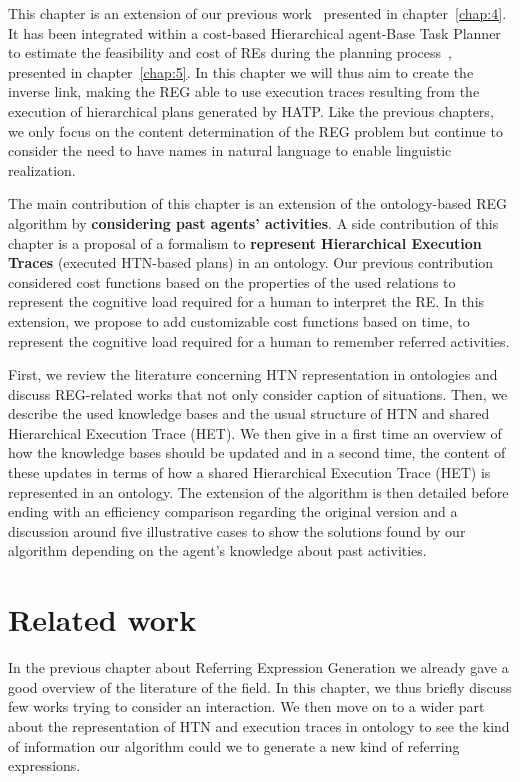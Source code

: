 This chapter is an extension of our previous work~\cite{buisan_2020_efficient} presented in chapter~\ref{chap:4}. It has been integrated within a cost-based Hierarchical agent-Base Task Planner to estimate the feasibility and cost of REs during the planning process~\cite{buisan_2020_human}, presented in chapter~\ref{chap:5}. In this chapter we will thus aim to create the inverse link, making the REG able to use execution traces resulting from the execution of hierarchical plans generated by HATP. Like the previous chapters, we only focus on the content determination of the REG problem but continue to consider the need to have names in natural language to enable linguistic realization.

The main contribution of this chapter is an extension of the ontology-based REG algorithm by \textbf{considering past agents' activities}. A side contribution of this chapter is a proposal of a formalism to \textbf{represent Hierarchical Execution Traces} (executed HTN-based plans) in an ontology. Our previous contribution considered cost functions based on the properties of the used relations to represent the cognitive load required for a human to interpret the RE. In this extension, we propose to add customizable cost functions based on time, to represent the cognitive load required for a human to remember referred activities.

First, we review the literature concerning HTN representation in ontologies and discuss REG-related works that not only consider caption of situations. Then, we describe the used knowledge bases and the usual structure of HTN and shared Hierarchical Execution Trace (HET). We then give in a first time an overview of how the knowledge bases should be updated and in a second time, the content of these updates in terms of how a shared Hierarchical Execution Trace (HET) is represented in an ontology. The extension of the algorithm is then detailed before ending with an efficiency comparison regarding the original version and a discussion around five illustrative cases to show the solutions found by our algorithm depending on the agent's knowledge about past activities.

\section{Related work}

In the previous chapter about Referring Expression Generation we already gave a good overview of the literature of the field. In this chapter, we thus briefly discuss few works trying to consider an interaction. We then move on to a wider part about the representation of HTN and execution traces in ontology to see the kind of information our algorithm could we to generate a new kind of referring expressions.

